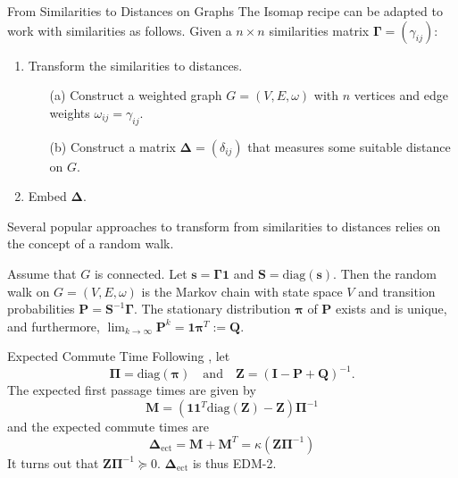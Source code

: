 \documentclass[professionalfonts,hyperref={pdfpagelabels=false,colorlinks=true,linkcolor=blue}]{beamer}
\begin{document}
\begin{frame}{From Similarities to Distances on Graphs}
  The Isomap recipe can be adapted to work with similarities as
  follows.
  \vskip10pt Given a $n \times n$ similarities matrix $\bm{\Gamma} = (\gamma_{ij})$:
  \begin{enumerate}
  \item Transform the similarities to distances.
    \begin{enumerate}
    \item[(a)]Construct a weighted graph $G = (V,E,\omega)$ with $n$
      vertices and edge weights $\omega_{ij} = \gamma_{ij}$.
    \item[(b)] Construct a matrix $\bm{\Delta} = (\delta_{ij})$
      that measures some suitable distance on $G$. 
    \end{enumerate}
  \item Embed $\bm{\Delta}$. 
  \end{enumerate}
  Several popular approaches to transform from similarities to
    distances relies on the concept of a \alert{random walk}.
    
    \vskip10pt Assume that $G$ is connected. Let $\bm{s} =
    \bm{\Gamma}\bm{1}$ and $\mathbf{S} = \mathrm{diag}(\bm{s})$. Then
    the random walk on $G = (V,E,\omega)$ is the Markov chain with
    state space $V$ and transition probabilities $\mathbf{P} =
    \mathbf{S}^{-1}\bm{\Gamma}$. The stationary distribution
    $\bm{\pi}$ of $\mathbf{P}$ exists and is unique, and furthermore,
    $\lim_{k \rightarrow \infty} \mathbf{P}^{k} = \bm{1}\bm{\pi}^{T}
    := \mathbf{Q}$.
\end{frame}

\begin{frame}{Expected Commute Time}
  Following \cite{kemeny83:_finit_markov_chain}, let
  \begin{equation*}
    \bm{\Pi} = \mathrm{diag}(\bm{\pi}) \quad \text{and} \quad
    \mathbf{Z} = (\mathbf{I} - \mathbf{P} + \mathbf{Q})^{-1}.
  \end{equation*}
  The expected first passage times are given by
  \begin{equation*}
    \mathbf{M} = (\mathbf{1}\mathbf{1}^{T}\mathrm{diag}(\mathbf{Z}) -
    \mathbf{Z})\bm{\Pi}^{-1} 
  \end{equation*}
  and the expected commute times are
  \begin{equation*}
    \bm{\Delta}_{\mathrm{ect}} = \mathbf{M} + \mathbf{M}^{T} =
    \kappa(\mathbf{Z}\bm{\Pi}^{-1})
  \end{equation*}
  It turns out that $\mathbf{Z}\bm{\Pi}^{-1} \succeq
  0$. $\bm{\Delta}_{\mathrm{ect}}$ is thus \alert{EDM-2}.
\end{frame}
\end{document}
